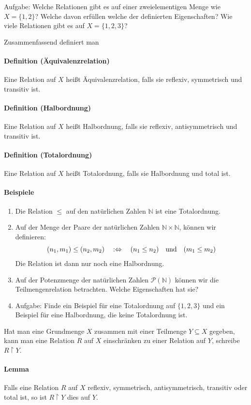 \documentclass[a4paper,11pt,abstracton]{scrartcl}
\begin{document}
Aufgabe: Welche Relationen gibt es auf einer zweielementigen Menge wie $X=\{1,2\}$? Welche davon erfüllen welche der definierten Eigenschaften? Wie viele Relationen gibt es auf $X=\{1,2,3\}$?

Zusammenfassend definiert man
\paragraph{Definition (Äquivalenzrelation)} Eine Relation auf $X$ heißt Äquivalenzrelation, falls sie reflexiv, symmetrisch und transitiv ist.
\paragraph{Definition (Halbordnung)} Eine Relation auf $X$ heißt Halbordnung, falls sie reflexiv, antisymmetrisch und transitiv ist.
\paragraph{Definition (Totalordnung)} Eine Relation auf $X$ heißt Totalordnung, falls sie Halbordnung und total ist.
\paragraph{Beispiele}
\begin{enumerate}
 \item Die Relation $\leq$ auf den natürlichen Zahlen $\mathbb{N}$ ist eine Totalordnung.
 \item Auf der Menge der Paare der natürlichen Zahlen $\mathbb{N} \times \mathbb{N}$, können wir definieren:
 \begin{equation}
  (n_1, m_1) \leq (n_2, m_2) \quad :\Leftrightarrow \quad (n_1 \leq n_2) \quad \textnormal{und} \quad (m_1 \leq m_2)
 \end{equation}
 Die Relation ist dann nur noch eine Halbordnung.
 \item Auf der Potenzmenge der natürlichen Zahlen $\mathcal{P}(\mathbb{N})$ können wir die Teilmengenrelation betrachten. Welche Eigenschaften hat sie?
 \item Aufgabe: Finde ein Beispiel für eine Totalordnung auf $\{1,2,3\}$ und ein Beispiel für eine Halbordnung, die keine Totalordnung ist.
\end{enumerate}
Hat man eine Grundmenge $X$ zusammen mit einer Teilmenge $Y \subseteq X$ gegeben, kann man eine Relation $R$ auf $X$ einschränken zu einer Relation auf $Y$, schreibe $R \upharpoonright Y$.
\paragraph{Lemma} Falls eine Relation $R$ auf $X$ reflexiv, symmetrisch, antisymmetrisch, transitiv oder total ist, so ist $R\upharpoonright Y$ dies auf $Y$.
\end{document}
